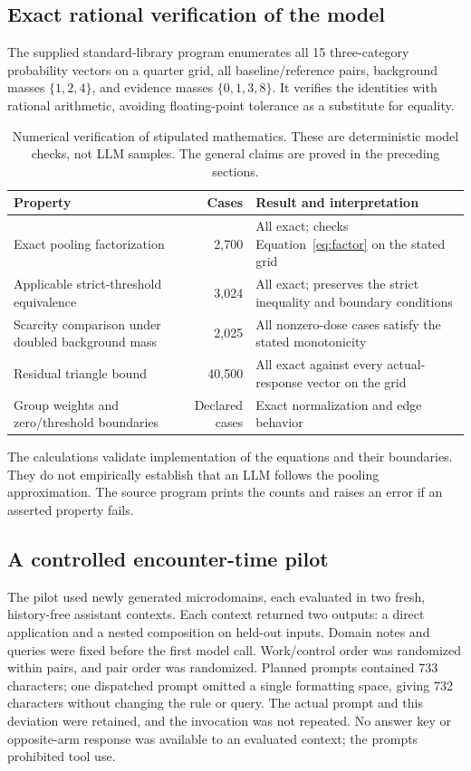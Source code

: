 \documentclass[11pt,letterpaper]{article}
\theoremstyle{definition}\newtheorem{definition}[theorem]{Definition}
\begin{document}
\subsection{Exact rational verification of the model}
The supplied standard-library program enumerates all 15 three-category probability vectors on a quarter grid, all baseline/reference pairs, background masses $\{1,2,4\}$, and evidence masses $\{0,1,3,8\}$. It verifies the identities with rational arithmetic, avoiding floating-point tolerance as a substitute for equality.
\begin{table}[htbp]\centering\small
\begin{tabularx}{\linewidth}{YrY}
\toprule
Property & Cases & Result and interpretation\\\midrule
Exact pooling factorization & 2,700 & All exact; checks Equation~\eqref{eq:factor} on the stated grid\\
Applicable strict-threshold equivalence & 3,024 & All exact; preserves the strict inequality and boundary conditions\\
Scarcity comparison under doubled background mass & 2,025 & All nonzero-dose cases satisfy the stated monotonicity\\
Residual triangle bound & 40,500 & All exact against every actual-response vector on the grid\\
Group weights and zero/threshold boundaries & Declared cases & Exact normalization and edge behavior\\
\bottomrule
\end{tabularx}
\caption{Numerical verification of stipulated mathematics. These are deterministic model checks, not LLM samples. The general claims are proved in the preceding sections.}
\label{tab:exact}
\end{table}
The calculations validate implementation of the equations and their boundaries. They do not empirically establish that an LLM follows the pooling approximation. The source program prints the counts and raises an error if an asserted property fails.

\subsection{A controlled encounter-time pilot}
The pilot used \PilotPairs{} newly generated microdomains, each evaluated in two fresh, history-free assistant contexts. Each context returned two outputs: a direct application and a nested composition on held-out inputs. Domain notes and queries were fixed before the first model call. Work/control order was randomized within pairs, and pair order was randomized. Planned prompts contained 733 characters; one dispatched prompt omitted a single formatting space, giving 732 characters without changing the rule or query. The actual prompt and this deviation were retained, and the invocation was not repeated. No answer key or opposite-arm response was available to an evaluated context; the prompts prohibited tool use.
\end{document}
